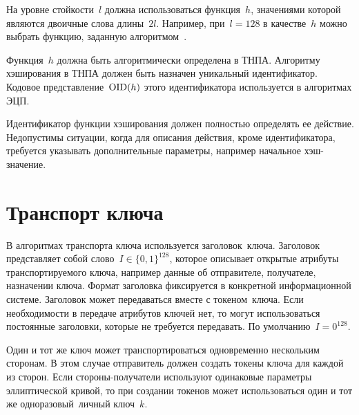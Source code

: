 На уровне стойкости~$l$ должна использоваться функция~$h$,
значениями которой являются двоичные слова длины~$2l$.
Например, при~$l=128$ в качестве~$h$ можно 
выбрать функцию, заданную алгоритмом~.

Функция~$h$ должна быть алгоритмически определена в ТНПА.
Алгоритму хэширования в ТНПА должен быть назначен уникальный идентификатор. 
Кодовое представление~$\text{\normalfont OID}(h)$ этого идентификатора 
используется в алгоритмах ЭЦП. 

Идентификатор функции хэширования должен полностью определять ее действие.
Недопустимы ситуации, когда для описания действия, кроме идентификатора,
требуется указывать дополнительные параметры, например
начальное хэш-значение.


\section{Транспорт ключа}\label{COMMON.Transport}

В алгоритмах транспорта ключа используется заголовок~ключа.
Заголовок представляет собой слово~$I\in\{0,1\}^{128}$,
которое описывает открытые атрибуты транспортируемого ключа,
например данные об отправителе, получателе, назначении ключа.
%
Формат заголовка фиксируется в конкретной информационной системе.
%
Заголовок может передаваться вместе с токеном~ключа.
%
%
Если необходимости в передаче атрибутов ключей нет,
то могут использоваться постоянные заголовки, 
которые не требуется передавать.
По умолчанию~$I=0^{128}$.

Один и тот же ключ может транспортироваться одновременно 
нескольким сторонам. В этом случае отправитель должен
создать токены ключа для каждой из сторон.
%
Если стороны-получатели используют одинаковые 
параметры эллиптической кривой, 
то при создании токенов может использоваться
один и тот же одноразовый~личный ключ~$k$.

